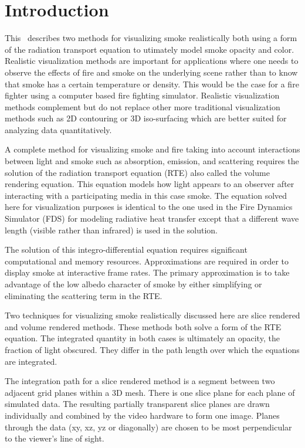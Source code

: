 %
%

\section{Introduction}

This \paper\ describes two methods for visualizing smoke realistically both using a form of the radiation transport equation\cite{Siegel:2001,kajiya:1986} to utimately model
smoke opacity and color. Realistic visualization methods are important for applications
where one needs to observe the effects of fire and smoke on the underlying scene
rather than to know that smoke has a certain temperature or density.  This would be the case for a fire fighter using a computer based fire fighting simulator.
Realistic visualization  methods complement but do not replace other more traditional visualization methods such as 2D
contouring or 3D iso-surfacing which are better suited for analyzing data quantitatively.

A complete method for visualizing smoke and fire taking into
account interactions between light and smoke such as absorption, emission, and scattering
requires the solution of the radiation transport equation (RTE)\cite{Siegel:2001} also called the volume rendering equation\cite{levoy:1988}.
This equation models how light appears to an observer after interacting with a participating media in this case smoke.
The equation solved here for visualization purposes is identical to the one used in the Fire Dynamics Simulator (FDS)\cite{FDS_Tech_Guide}
for modeling radiative heat transfer except that a different wave length (visible rather than infrared) is used in the solution.

The
solution of this integro-differential equation requires significant
computational and memory  resources.  Approximations
are required in order to display smoke at
interactive frame rates.  The primary approximation is to take
advantage of the low albedo character of smoke by either simplifying or eliminating the scattering term in the RTE.

Two techniques for visualizing smoke realistically discussed here are slice rendered and volume
rendered methods.  These methods both solve a form of the RTE equation.
The integrated quantity in both cases is ultimately an opacity, the fraction of light obscured.
They
differ in the path length over which the equations are integrated.

The integration path for a slice rendered method is a segment between two adjacent grid planes within a 3D mesh.
There is one slice plane for each plane of simulated data.
The resulting partially transparent slice planes are drawn individually and
combined by the video hardware to form one image. Planes through the data (xy, xz, yz or diagonally) are chosen to be most perpendicular to the viewer's line of sight.

